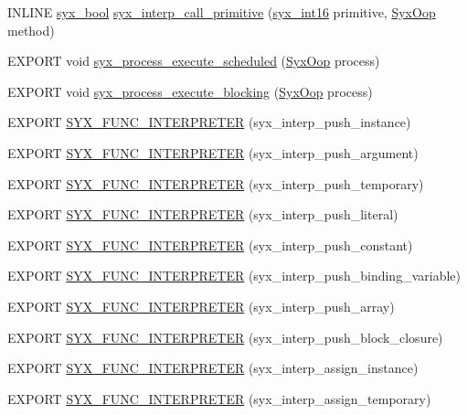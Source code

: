 \begin{CompactItemize}
\item 
INLINE \hyperlink{syx-types_8h_c6dc09b276b99fa1956364359139daab}{syx\_\-bool} \hyperlink{syx-interp_8h_91229ee5f9766714c7bdfb51cfb34258}{syx\_\-interp\_\-call\_\-primitive} (\hyperlink{syx-types_8h_2d6178ce3abc15f1a0df5bbd7eb5e302}{syx\_\-int16} primitive, \hyperlink{syx-types_8h_1121caba2d40b2ce090b640762744ccd}{SyxOop} method)
\item 
EXPORT void \hyperlink{syx-interp_8h_eafe6b33c73dafb5b724de995c487e1b}{syx\_\-process\_\-execute\_\-scheduled} (\hyperlink{syx-types_8h_1121caba2d40b2ce090b640762744ccd}{SyxOop} process)
\item 
EXPORT void \hyperlink{syx-interp_8h_1260b0caa0982d0e6d2d0a858bea5867}{syx\_\-process\_\-execute\_\-blocking} (\hyperlink{syx-types_8h_1121caba2d40b2ce090b640762744ccd}{SyxOop} process)
\item 
EXPORT \hyperlink{syx-interp_8h_54820f46e37cdbc55742dbe9280161a3}{SYX\_\-FUNC\_\-INTERPRETER} (syx\_\-interp\_\-push\_\-instance)
\item 
EXPORT \hyperlink{syx-interp_8h_b3211faac2a5031ccc2cf7377e9e0588}{SYX\_\-FUNC\_\-INTERPRETER} (syx\_\-interp\_\-push\_\-argument)
\item 
EXPORT \hyperlink{syx-interp_8h_bd9368dc223c16d153755a3c683b6147}{SYX\_\-FUNC\_\-INTERPRETER} (syx\_\-interp\_\-push\_\-temporary)
\item 
EXPORT \hyperlink{syx-interp_8h_2355b0e443b14065e6e4425c159e5783}{SYX\_\-FUNC\_\-INTERPRETER} (syx\_\-interp\_\-push\_\-literal)
\item 
EXPORT \hyperlink{syx-interp_8h_25428c9656a55f62d7bb473387f53638}{SYX\_\-FUNC\_\-INTERPRETER} (syx\_\-interp\_\-push\_\-constant)
\item 
EXPORT \hyperlink{syx-interp_8h_06ccc6ddebb2f2c838192a2696c61515}{SYX\_\-FUNC\_\-INTERPRETER} (syx\_\-interp\_\-push\_\-binding\_\-variable)
\item 
EXPORT \hyperlink{syx-interp_8h_bf880c666489c64cdd903d3d88d94ead}{SYX\_\-FUNC\_\-INTERPRETER} (syx\_\-interp\_\-push\_\-array)
\item 
EXPORT \hyperlink{syx-interp_8h_10b1b7a3e4254ef8fc5b78d527494502}{SYX\_\-FUNC\_\-INTERPRETER} (syx\_\-interp\_\-push\_\-block\_\-closure)
\item 
EXPORT \hyperlink{syx-interp_8h_de8bfe87ab591e15d025f6a3d768ec28}{SYX\_\-FUNC\_\-INTERPRETER} (syx\_\-interp\_\-assign\_\-instance)
\item 
EXPORT \hyperlink{syx-interp_8h_533bdb40c884765460fe0bae489a5e53}{SYX\_\-FUNC\_\-INTERPRETER} (syx\_\-interp\_\-assign\_\-temporary)

\end{CompactItemize}
